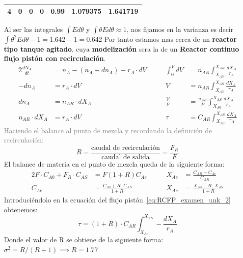 \begin{enumerate}[label={\alph*)}]
\begin{center}
\begin{tabular}{|c|c|c|c|c|c|c|}
			      4        & 0    & 0                & 0                  & 0.99                & 1.079375                         & 1.641719                           \\ \hline
		      \end{tabular}
	      \end{center}
	      \noindent Al ser las integrales $\int E d\theta$ y $\int \theta E d\theta \approx 1$, nos fijamos en la varianza es decir $\int \theta^2 E d\theta - 1 = 1.642 - 1 = 0.642$ Por tanto estamos mas cerca de un \textbf{reactor tipo tanque agitado}, cuya \textbf{modelización} sera la de un \textbf{Reactor continuo flujo pistón con recirculación}.
	      \begin{alignat}{2}
		      \frac{dN_A}{dt}   & = n_A - (n_A + dn_A) - r_A \cdot dV & \qquad \int_0^V dV & = n_{AR} \int_{X_{A0}}^{X_{AR}} \frac{dX_A}{r_A} \nonumber                    \\[6pt]
		      -dn_A             & = r_A \cdot dV                      & \qquad V           & = n_{AR} \int_{X_{A0}}^{X_{AS}} \frac{dX_A}{r_A} \nonumber                    \\[6pt]
		      dn_A              & = n_{AR} \cdot dX_A                 & \qquad \frac{V}{F} & = \frac{n_{AR}}{F} \int_{X_{A0}}^{X_{AS}} \frac{dX_A}{r_A} \nonumber          \\[6pt]
		      n_{AR} \cdot dX_A & = r_A \cdot dV                      & \qquad \tau        & = C_{AR} \int_{X_{A0}}^{X_{AS}} \frac{dX_A}{r_A} \label{eq:RCFP_examen_unk_2}
	      \end{alignat}
	      {\small\textcolor{gray}{Haciendo el balance al punto de mezcla y recordando la definición de recirculación:}}
	      \begin{equation*}
		      R = \frac{\text{caudal de recirculación}}{\text{caudal de salida}} = \frac{F_R}{F}
	      \end{equation*}
	      \noindent El balance de materia en el punto de mezcla queda de la siguiente forma:
	      \begin{alignat*}{2}
		      F \cdot C_{A0} + F_R \cdot C_{AS} & = F(1 + R)C_{Ae}                        & \qquad X_{Ae} & = \frac{C_{AR}-C_{Ae}}{C_{AR}}       \\[6pt]
		      C_{Ae}                            & = \frac{C_{A0} + R \cdot C_{AS}}{1 + R} & \qquad X_{Ae} & = \frac{X_{A0} + R\cdot X_{AS}}{1+R}
	      \end{alignat*}
	      \noindent Introduciéndolo en la ecuación del flujo pistón~\eqref{eq:RCFP_examen_unk_2} obtenemos:
	      \begin{equation*}
		      \tau = (1+R)\cdot C_{AR}\int_{X_{Ae}}^{X_{AS}}-\frac{dX_A}{r_A}
	      \end{equation*}
	      Donde el valor de R se obtiene de la siguiente forma: $\sigma^2 = R/(R+1) \implies R = 1.77$
\end{enumerate}
